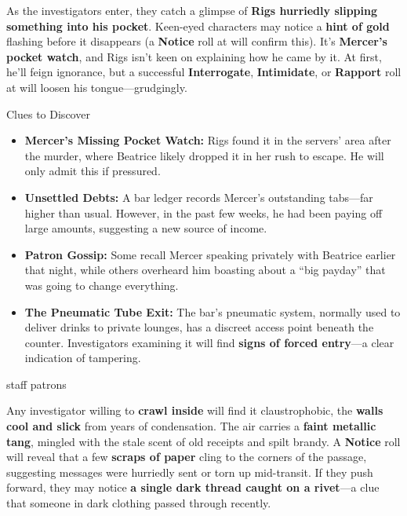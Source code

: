 As the investigators enter, they catch a glimpse of \textbf{Rigs hurriedly slipping something into his pocket}. Keen-eyed characters may notice a \textbf{hint of gold} flashing before it disappears (a \textbf{Notice} roll at  will confirm this). It’s \textbf{Mercer’s pocket watch}, and Rigs isn’t keen on explaining how he came by it. At first, he’ll feign ignorance, but a successful \textbf{Interrogate}, \textbf{Intimidate}, or \textbf{Rapport} roll at \Formidable will loosen his tongue—grudgingly.

\begin{CommentBox}{Clues to Discover}  
	\begin{itemize}  
		\item \textbf{Mercer’s Missing Pocket Watch:} Rigs found it in the servers’ area after the murder, where Beatrice likely dropped it in her rush to escape. He will only admit this if pressured.  
		\item \textbf{Unsettled Debts:} A bar ledger records Mercer’s outstanding tabs—far higher than usual. However, in the past few weeks, he had been paying off large amounts, suggesting a new source of income.  
		\item \textbf{Patron Gossip:} Some recall Mercer speaking privately with Beatrice earlier that night, while others overheard him boasting about a “big payday” that was going to change everything.  
		\item \textbf{The Pneumatic Tube Exit:} The bar’s pneumatic system, normally used to deliver drinks to private lounges, has a discreet access point beneath the counter. Investigators examining it will find \textbf{signs of forced entry}—a clear indication of tampering.  
	\end{itemize}  
\end{CommentBox}  

\BeginBoxPage
\begin{multicols}{2}
{staff}
\newcolumn
{patrons}
\end{multicols}
\EndBoxPage


Any investigator willing to \textbf{crawl inside} will find it claustrophobic, the \textbf{walls cool and slick} from years of condensation. The air carries a \textbf{faint metallic tang}, mingled with the stale scent of old receipts and spilt brandy. A  \textbf{Notice} roll will reveal that a few \textbf{scraps of paper} cling to the corners of the passage, suggesting messages were hurriedly sent or torn up mid-transit. If they push forward, they may notice \textbf{a single dark thread caught on a rivet}—a clue that someone in dark clothing passed through recently.  


